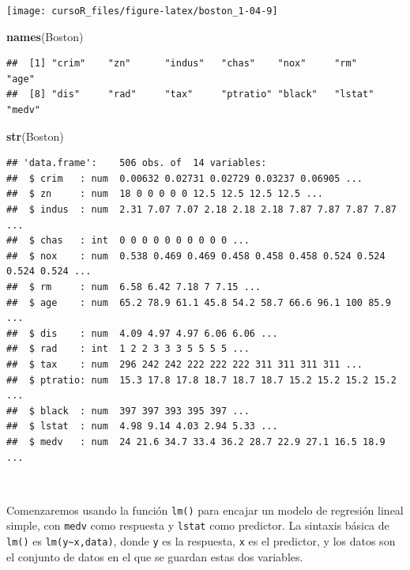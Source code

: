 \documentclass[]{book}
\newenvironment{Shaded}{\begin{snugshade}}{\end{snugshade}}
\newcommand{\KeywordTok}[1]{\textcolor[rgb]{0.13,0.29,0.53}{\textbf{#1}}}
\newcommand{\NormalTok}[1]{#1}
\begin{document}
\begin{center}\texttt{[image: cursoR\_files/figure-latex/boston\_1-04-9]} \end{center}

\begin{Shaded}
\begin{Highlighting}[]
\KeywordTok{names}\NormalTok{(Boston)}
\end{Highlighting}
\end{Shaded}

\begin{verbatim}
##  [1] "crim"    "zn"      "indus"   "chas"    "nox"     "rm"      "age"    
##  [8] "dis"     "rad"     "tax"     "ptratio" "black"   "lstat"   "medv"
\end{verbatim}

\begin{Shaded}
\begin{Highlighting}[]
\KeywordTok{str}\NormalTok{(Boston)}
\end{Highlighting}
\end{Shaded}

\begin{verbatim}
## 'data.frame':    506 obs. of  14 variables:
##  $ crim   : num  0.00632 0.02731 0.02729 0.03237 0.06905 ...
##  $ zn     : num  18 0 0 0 0 0 12.5 12.5 12.5 12.5 ...
##  $ indus  : num  2.31 7.07 7.07 2.18 2.18 2.18 7.87 7.87 7.87 7.87 ...
##  $ chas   : int  0 0 0 0 0 0 0 0 0 0 ...
##  $ nox    : num  0.538 0.469 0.469 0.458 0.458 0.458 0.524 0.524 0.524 0.524 ...
##  $ rm     : num  6.58 6.42 7.18 7 7.15 ...
##  $ age    : num  65.2 78.9 61.1 45.8 54.2 58.7 66.6 96.1 100 85.9 ...
##  $ dis    : num  4.09 4.97 4.97 6.06 6.06 ...
##  $ rad    : int  1 2 2 3 3 3 5 5 5 5 ...
##  $ tax    : num  296 242 242 222 222 222 311 311 311 311 ...
##  $ ptratio: num  15.3 17.8 17.8 18.7 18.7 18.7 15.2 15.2 15.2 15.2 ...
##  $ black  : num  397 397 393 395 397 ...
##  $ lstat  : num  4.98 9.14 4.03 2.94 5.33 ...
##  $ medv   : num  24 21.6 34.7 33.4 36.2 28.7 22.9 27.1 16.5 18.9 ...
\end{verbatim}

~

Comenzaremos usando la función \texttt{lm()} para encajar un modelo de
regresión lineal simple, con \texttt{medv} como respuesta y
\texttt{lstat} como predictor. La sintaxis básica de \texttt{lm()} es
\texttt{lm(y\textasciitilde{}x,data)}, donde \texttt{y} es la respuesta,
\texttt{x} es el predictor, y los datos son el conjunto de datos en el
que se guardan estas dos variables.
\end{document}
